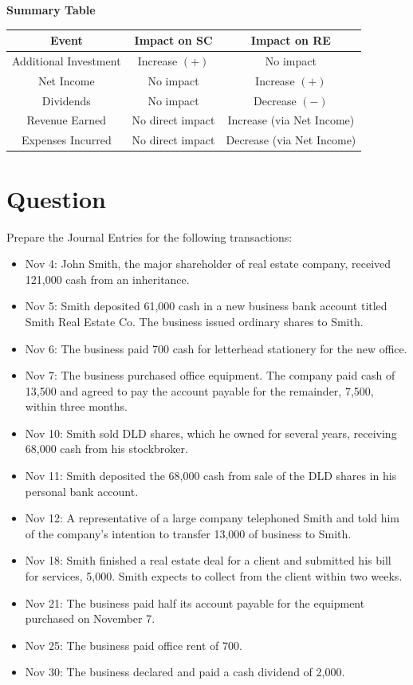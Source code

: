 \documentclass[12pt,a4paper]{book}
\begin{document}
\vspace{0.5cm}
\begin{center}
\textbf{Summary Table}\\
\begin{tabular}{|c|c|c|}
\hline
\textbf{Event} & \textbf{Impact on SC} & \textbf{Impact on RE} \\
\hline
Additional Investment & Increase $(+)$ & No impact \\
Net Income & No impact & Increase $(+)$ \\
Dividends & No impact & Decrease $(-)$ \\
Revenue Earned & No direct impact & Increase (via Net Income) \\
Expenses Incurred & No direct impact & Decrease (via Net Income) \\
\hline
\end{tabular}
\end{center}

\vspace{1cm}
\clearpage

\section*{Question}

Prepare the Journal Entries for the following transactions:

\begin{itemize}
    \item Nov 4: John Smith, the major shareholder of real estate company, received 121,000 cash from an inheritance.
    \item Nov 5: Smith deposited 61,000 cash in a new business bank account titled Smith Real Estate Co. The business issued ordinary shares to Smith.
    \item Nov 6: The business paid 700 cash for letterhead stationery for the new office.
    \item Nov 7: The business purchased office equipment. The company paid cash of 13,500 and agreed to pay the account payable for the remainder, 7,500, within three months.
    \item Nov 10: Smith sold DLD shares, which he owned for several years, receiving 68,000 cash from his stockbroker.
    \item Nov 11: Smith deposited the 68,000 cash from sale of the DLD shares in his personal bank account.
    \item Nov 12: A representative of a large company telephoned Smith and told him of the company's intention to transfer 13,000 of business to Smith.
    \item Nov 18: Smith finished a real estate deal for a client and submitted his bill for services, 5,000. Smith expects to collect from the client within two weeks.
    \item Nov 21: The business paid half its account payable for the equipment purchased on November 7.
    \item Nov 25: The business paid office rent of 700.
    \item Nov 30: The business declared and paid a cash dividend of 2,000.
\end{itemize}
\end{document}
